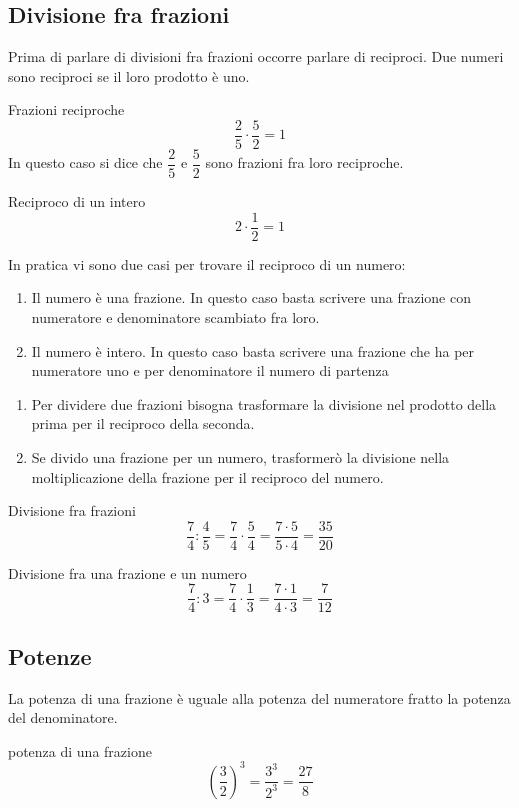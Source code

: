 	 \subsection{Divisione fra frazioni}
Prima di parlare di divisioni fra frazioni occorre parlare di reciproci. Due numeri sono reciproci se il loro prodotto è uno.
\begin{esempio}
 Frazioni reciproche\[\dfrac{2}{5}\cdot\dfrac{5}{2}=1\]In questo caso si dice che $\dfrac{2}{5}$ e $\dfrac{5}{2}$ sono frazioni fra loro reciproche.
\end{esempio}
\begin{esempio}
Reciproco di un intero \[2\cdot\dfrac{1}{2}=1\]
\end{esempio}
In pratica  vi sono due casi per trovare il reciproco di un numero:
\begin{enumerate}
	\item Il numero è una frazione. In questo caso basta scrivere una frazione con numeratore e denominatore scambiato fra loro.
	\item Il numero è  intero. In questo caso basta scrivere una frazione che ha per numeratore uno e per denominatore il numero di partenza 
\end{enumerate}
\begin{enumerate}
\item Per dividere due frazioni bisogna trasformare la divisione nel prodotto della prima per il reciproco della seconda.
\item Se divido una frazione per un numero, trasformerò la divisione nella moltiplicazione della frazione per il reciproco del numero.
\end{enumerate}
\begin{esempio}
Divisione fra frazioni
\[\dfrac{7}{4}:\dfrac{4}{5}=\dfrac{7}{4}\cdot\dfrac{5}{4}=\dfrac{7\cdot 5}{5\cdot 4}=\dfrac{35}{20}\]
\end{esempio}
\begin{esempio}
Divisione fra una frazione e un numero
\[\dfrac{7}{4}:3=\dfrac{7}{4}\cdot\dfrac{1}{3}=\dfrac{7\cdot 1}{4\cdot 3}=\dfrac{7}{12} \]
\end{esempio}
\subsection{Potenze}
La potenza di una frazione è uguale alla potenza del numeratore fratto la potenza del denominatore.
\begin{esempio}
potenza di una frazione
\[\left( \dfrac{3}{2}\right)^3=\dfrac{3^3}{2^3}=\dfrac{27}{8} \]
\end{esempio}


